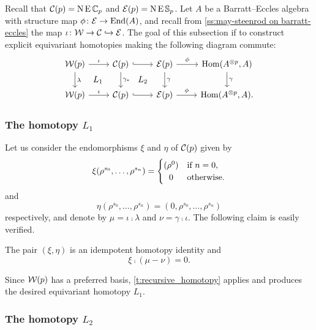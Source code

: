 Recall that $\mathcal{C}(p) = \operatorname{N} \operatorname{E} \mathbb{C}_p$ and $\mathcal{E}(p) = \operatorname{N} \operatorname{E} \mathbb{S}_p$.
Let $A$ be a Barratt--Eccles algebra with structure map $\phi \colon \mathcal{E} \to \mathrm{End}(A)$, and recall from \cref{ss:may-steenrod on barratt-eccles} the map $\iota \colon \mathcal{W} \to \mathcal{C} \hookrightarrow \mathcal{E}$.
The goal of this subsection if to construct explicit equivariant homotopies making the following diagram commute:
\[
\begin{tikzcd}
	\cW(p) \arrow[r, "\iota"] \arrow[d,"\lambda"] \arrow[dr,phantom,"L_1"] &
	\cC(p) \arrow[r, hook] \arrow[d, "\gamma_\ast"] \arrow[dr,phantom,"L_2"] &
	\BE(p) \arrow[r,"\phi"] \arrow[d,"\gamma"] &
	\Hom(A^{\ot p}, A) \arrow[d,"\gamma"] \\
	\cW(p) \arrow[r, "\iota"] &
	\cC(p) \arrow[r, hook] &
	\BE(p) \arrow[r,"\phi"] &
	\Hom(A^{\ot p}, A).
\end{tikzcd}
\]

\subsubsection{The homotopy $L_1$}

Let us consider the endomorphisms $\xi$ and $\eta$ of $\mathcal{C}(p)$ given by
\[
\xi(\rho^{s_0},\dots,\rho^{s_n}) =
\begin{cases}
	(\rho^0) & \text{if } n = 0, \\
	\hfil0 & \text{otherwise}.
\end{cases}
\]
and
\[
\eta(\rho^{s_0},\dots,\rho^{s_n}) = (0,\rho^{s_0},\dots,\rho^{s_n})
\]
respectively, and denote by $\mu = \iota \comp \lambda$ and $\nu = \gamma \comp \iota$.
The following claim is easily verified.

\begin{lemma}
	The pair $(\xi,\eta)$ is an idempotent homotopy identity and
	\[
	\xi \comp (\mu - \nu) = 0.
	\]
\end{lemma}
Since $\mathcal{W}(p)$ has a preferred basis, \cref{t:recursive_homotopy} applies and produces the desired equivariant homotopy $L_1$.

\subsubsection{The homotopy $L_2$}

